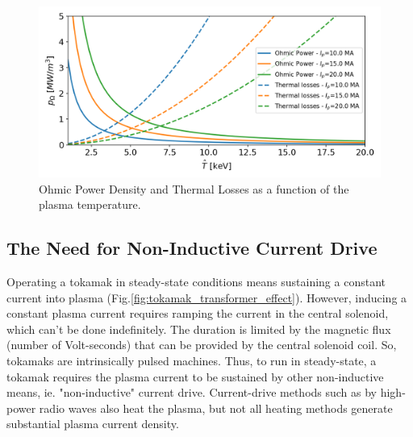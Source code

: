 \begin{figure}[h]
	\centering
	\includegraphics[width=1\linewidth]{figures/chap1/OhmicPower_vs_ThermalLosses}
	\caption{Ohmic Power Density and Thermal Losses as a function of the plasma temperature.}
	\label{fig:ohmicpowervsthermallosses}
\end{figure}

\subsection{The Need for Non-Inductive Current Drive}

Operating a tokamak in steady-state conditions means sustaining a constant current into plasma (Fig.\ref{fig:tokamak_transformer_effect}). However, inducing a constant plasma current requires ramping the current in the central solenoid, which can't be done indefinitely. The duration is limited by the magnetic flux (number of Volt-seconds) that can be provided by the central solenoid coil. So, tokamaks are intrinsically pulsed machines.
Thus, to run in steady-state, a tokamak requires the plasma current to be sustained by other non-inductive means, ie. "non-inductive" current drive. Current-drive methods such as by high-power radio waves also heat the plasma, but not all heating methods generate substantial plasma current density. 

